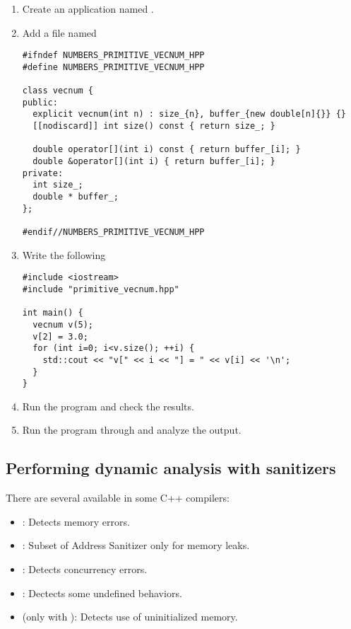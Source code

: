 \begin{enumerate}

\item
Create an application named .

\item Add a file named 

\begin{lstlisting}
#ifndef NUMBERS_PRIMITIVE_VECNUM_HPP
#define NUMBERS_PRIMITIVE_VECNUM_HPP

class vecnum {
public:
  explicit vecnum(int n) : size_{n}, buffer_{new double[n]{}} {}
  [[nodiscard]] int size() const { return size_; }

  double operator[](int i) const { return buffer_[i]; }
  double &operator[](int i) { return buffer_[i]; }
private:
  int size_;
  double * buffer_;
};

#endif//NUMBERS_PRIMITIVE_VECNUM_HPP
\end{lstlisting}

\item
Write the following 

\begin{lstlisting}
#include <iostream>
#include "primitive_vecnum.hpp"

int main() {
  vecnum v(5);
  v[2] = 3.0;
  for (int i=0; i<v.size(); ++i) {
    std::cout << "v[" << i << "] = " << v[i] << '\n';
  }
}
\end{lstlisting}

\item
Run the program and check the results.

\item
Run the program through  and analyze the output.

\end{enumerate}

\subsection{Performing dynamic analysis with sanitizers}

There are several  available in some C++ compilers:

\begin{itemize}
  \item {}: Detects memory errors.
  \item {}: Subset of Address Sanitizer only for memory leaks.
  \item {}: Detects concurrency errors.
  \item {}: Dectects some undefined behaviors.
  \item {} (only with ): Detects use of uninitialized memory.
\end{itemize}

